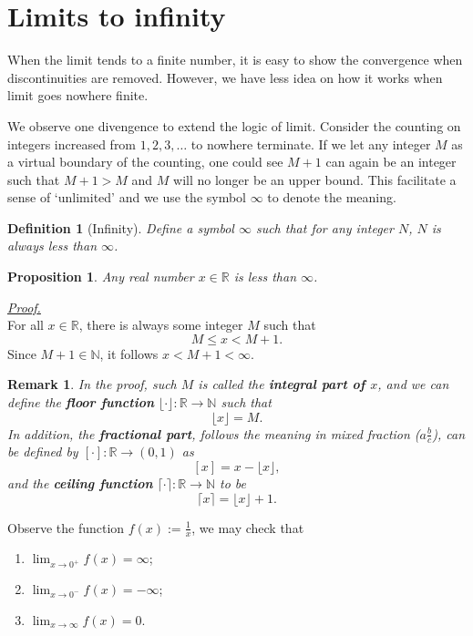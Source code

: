 \documentclass[12pt]{article}
\newtheorem{definition}{Definition}[section]
\newtheorem*{proposition}{Proposition}
\newtheorem*{remark}{Remark}
\renewenvironment{proof}[1][Proof]{\begin{snugshade*} \underline{\textit{{#1}.}}\\}{\hfill \qedsymbol \end{snugshade*}}
\begin{document}
    \section{Limits to infinity}

    When the limit tends to a finite number, it is easy to show the convergence when discontinuities are removed. However, we have less idea on how it works when limit goes nowhere finite.
    
    We observe one divengence to extend the logic of limit. Consider the counting on integers increased from $1,2,3,\dots$ to nowhere terminate. If we let any integer $M$ as a virtual boundary of the counting, one could see $M+1$ can again be an integer such that $M+1>M$ and $M$ will no longer be an upper bound. This facilitate a sense of `unlimited' and we use the symbol $\infty$ to denote the meaning.

    \begin{definition}[Infinity]
        Define a symbol $\infty$ such that for any integer $N$, $N$ is always less than $\infty$.
    \end{definition}

    \begin{proposition}
        Any real number $x\in\mathbb{R}$ is less than $\infty$.
    \end{proposition}

    \begin{proof}
        For all $x\in \mathbb{R}$, there is always some integer $M$ such that \[M\leq x< M+1.\] Since $M+1\in\mathbb{N}$, it follows $x<M+1<\infty$.
    \end{proof}

    \begin{remark}
        In the proof, such $M$ is called the \textbf{integral part of $x$}, and we can define the \textbf{floor function} $\lfloor \cdot \rfloor:\mathbb{R}\to\mathbb{N}$ such that \[\lfloor x \rfloor = M.\] In addition, the \textbf{fractional part}, follows the meaning in mixed fraction ($a\frac{b}{c}$), can be defined by $[\cdot]:\mathbb{R}\to (0,1)$ as \[[x]=x-\lfloor x \rfloor,\] and the \textbf{ceiling function} $\lceil \cdot \rceil:\mathbb{R}\to\mathbb{N}$ to be \[\lceil x \rceil=\lfloor x \rfloor + 1.\]
    \end{remark}

    Observe the function $f(x):=\frac{1}{x}$, we may check that \begin{enumerate}
        \item $\displaystyle \lim_{x\to 0^+}f(x)=\infty$;
        \item $\displaystyle \lim_{x\to 0^-}f(x)=-\infty$;
        \item $\displaystyle \lim_{x\to \infty}f(x)=0$.
    \end{enumerate}
\end{document}
